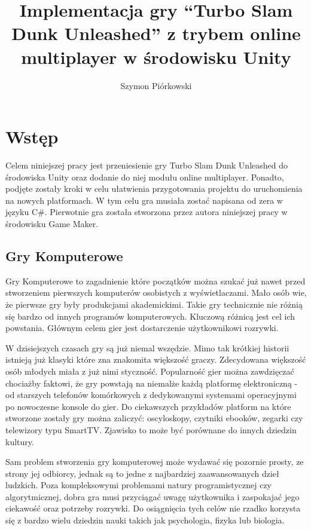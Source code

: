\documentclass[a4paper,12pt,twoside,openany]{report}
\title{Implementacja gry “Turbo Slam Dunk Unleashed” z trybem online multiplayer w środowisku Unity}
\author{Szymon Piórkowski}
\begin{document}
\maketitle

\chapter{Wstęp}
Celem niniejszej pracy jest przeniesienie gry Turbo Slam Dunk Unleashed do środowiska Unity oraz dodanie do niej modułu online multiplayer. Ponadto, podjęte zostały kroki w celu ułatwienia przygotowania projektu do uruchomienia na nowych platformach. W tym celu gra musiała zostać napisana od zera w języku C\#. Pierwotnie gra została stworzona przez autora niniejszej pracy w środowisku Game Maker.

\section{Gry Komputerowe}
Gry Komputerowe to zagadnienie które początków można szukać już nawet przed stworzeniem pierwszych komputerów osobistych z wyświetlaczami. Mało osób wie, że pierwsze gry były produkcjami akademickimi. Takie gry technicznie nie różnią się bardzo od innych programów komputerowych. Kluczową różnicą jest cel ich powstania. Głównym celem gier jest dostarczenie użytkownikowi rozrywki.

W dzisiejszych czasach gry są już niemal wszędzie. Mimo tak krótkiej historii istnieją już klasyki które zna znakomita większość graczy. Zdecydowana większość osób młodych miała z już nimi styczność. Popularność gier można zawdzięczać chociażby faktowi, że gry powstają na niemalże każdą platformę elektroniczną - od starszych telefonów komórkowych z dedykowanymi systemami operacyjnymi po nowoczesne konsole do gier. Do ciekawszych przykładów platform na które stworzone zostały gry można zaliczyć: oscyloskopy, czytniki ebooków, zegarki czy telewizory typu SmartTV. Zjawisko to może być porównane do innych dziedzin kultury.

Sam problem stworzenia gry komputerowej może wydawać się pozornie prosty, ze strony jej odbiorcy, jednak są to jedne z najbardziej zaawansowanych dzieł ludzkich. Poza kompleksowymi problemami natury programistycznej czy algorytmicznej, dobra gra musi przyciągać uwagę użytkownika i zaspokajać jego ciekawość oraz potrzeby rozrywki. Do osiągnięcia tych celów nie rzadko korzysta się z bardzo wielu dziedzin nauki takich jak psychologia, fizyka lub biologia.
\end{document}
